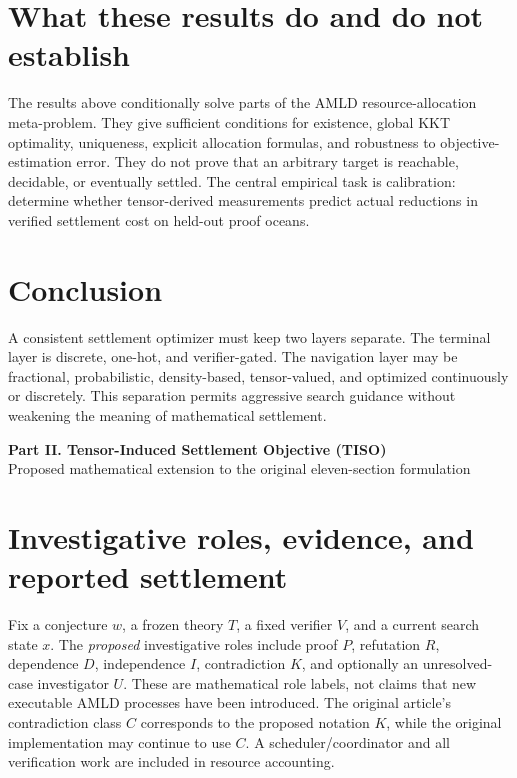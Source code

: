 \documentclass[11pt]{article}
\begin{document}
\section{What these results do and do not establish}\label{sec:scope}
The results above conditionally solve parts of the AMLD resource-allocation meta-problem. They give sufficient conditions for existence, global KKT optimality, uniqueness, explicit allocation formulas, and robustness to objective-estimation error. They do not prove that an arbitrary target is reachable, decidable, or eventually settled. The central empirical task is calibration: determine whether tensor-derived measurements predict actual reductions in verified settlement cost on held-out proof oceans.

\section{Conclusion}\label{sec:conclusion-original}
A consistent settlement optimizer must keep two layers separate. The terminal layer is discrete, one-hot, and verifier-gated. The navigation layer may be fractional, probabilistic, density-based, tensor-valued, and optimized continuously or discretely. This separation permits aggressive search guidance without weakening the meaning of mathematical settlement.

\clearpage
\begin{center}
{\Large\bfseries Part II. Tensor-Induced Settlement Objective (TISO)}\\[4pt]
{\small Proposed mathematical extension to the original eleven-section formulation}
\end{center}

\section{Investigative roles, evidence, and reported settlement}\label{sec:reports}
Fix a conjecture $w$, a frozen theory $T$, a fixed verifier $V$, and a current search state $x$. The \emph{proposed} investigative roles include proof $P$, refutation $R$, dependence $D$, independence $I$, contradiction $K$, and optionally an unresolved-case investigator $U$. These are mathematical role labels, not claims that new executable AMLD processes have been introduced. The original article's contradiction class $C$ corresponds to the proposed notation $K$, while the original implementation may continue to use $C$. A scheduler/coordinator and all verification work are included in resource accounting.
\end{document}
